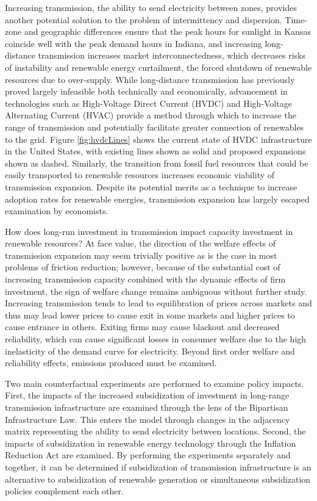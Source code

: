 \documentclass[12pt]{article}
\begin{document}
Increasing transmission, the ability to send electricity between zones, provides another potential solution to the problem of intermittency and dispersion. Time-zone and geographic differences ensure that the peak hours for sunlight in Kansas coincide well with the peak demand hours in Indiana, and increasing long-distance transmission increases market interconnectedness, which decreases risks of instability and renewable energy curtailment, the forced shutdown of renewable resources due to over-supply. While long-distance transmission has previously proved largely infeasible both technically and economically, advancement in technologies such as High-Voltage Direct Current (HVDC) and High-Voltage Alternating Current (HVAC) provide a method through which to increase the range of transmission and potentially facilitate greater connection of renewables to the grid. Figure \ref{fig:hvdcLines} shows the current state of HVDC infrastructure in the United States, with existing lines shown as solid and proposed expansions shown as dashed. Similarly, the transition from fossil fuel resources that could be easily transported to renewable resources increases economic viability of transmission expansion. Despite its potential merits as a technique to increase adoption rates for renewable energies, transmission expansion has largely escaped examination by economists.

How does long-run investment in transmission impact capacity investment in renewable resources? At face value, the direction of the welfare effects of transmission expansion may seem trivially positive as is the case in most problems of friction reduction; however, because of the substantial cost of increasing transmission capacity combined with the dynamic effects of firm investment, the sign of welfare change remains ambiguous without further study. Increasing transmission tends to lead to equilibration of prices across markets and thus may lead lower prices to cause exit in some markets and higher prices to cause entrance in others. Exiting firms may cause blackout and decreased reliability, which can cause significant losses in consumer welfare due to the high inelasticity of the demand curve for electricity. Beyond first order welfare and reliability effects, emissions produced must be examined. 

Two main counterfactual experiments are performed to examine policy impacts. First, the impacts of the increased subsidization of investment in long-range transmission infrastructure are examined through the lens of the Bipartisan Infrastructure Law. This enters the model through changes in the adjacency matrix representing the ability to send electricity between locations. Second, the impacts of subsidization in renewable energy technology through the Inflation Reduction Act are examined. By performing the experiments separately and together, it can be determined if subsidization of transmission infrastructure is an alternative to subsidization of renewable generation or simultaneous subsidization policies complement each other.
\end{document}
